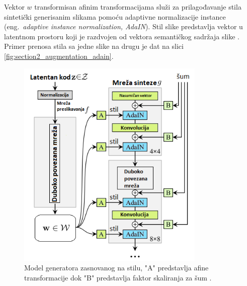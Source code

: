 \documentclass[12pt,oneside]{memoir}
\begin{document}
Vektor \(w\) transformisan afinim transformacijama služi za prilagođavanje stila sintetički generisanim slikama pomoću adaptivne normalizacije instance (eng.~\textit{adaptive instance normalization, AdaIN}). Stil slike predstavlja vektor u latentnom prostoru koji je razdvojen od vektora semantičkog sadržaja slike \cite{huang2017arbitrary}. Primer prenosa stila sa jedne slike na drugu je dat na slici \ref{fig:section2_augmentation_adain}.


\begin{figure}[ht]
    \centering
    \includegraphics[width=0.8\textwidth]{matfmaster/glava2/stylegan_cus3.png}
    \caption{Model generatora zasnovanog na stilu, "A" predstavlja afine transformacije dok "B" predstavlja faktor skaliranja za šum \cite{karras2019style}. }
    \label{fig:section2_augmentation_stylegan}
\end{figure}
\end{document}
